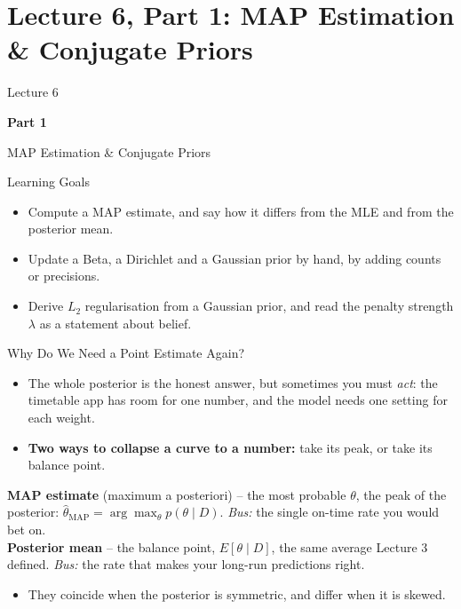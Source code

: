 \section{Lecture 6, Part 1: MAP Estimation \& Conjugate Priors}

\begin{frame}
\vfill
\centering
{\color{RLBlue}\large Lecture 6}

\vspace{0.3em}
{\color{RLBlue}\Large\bfseries Part 1}

\vspace{0.6em}
{\Large MAP Estimation \& Conjugate Priors}
\vfill
\end{frame}

\begin{frame}{Learning Goals}
\begin{itemize}
  \item Compute a MAP estimate, and say how it differs from the MLE and from the posterior mean.
  \pause
  \item Update a Beta, a Dirichlet and a Gaussian prior by hand, by adding counts or precisions.
  \pause
  \item Derive $L_2$ regularisation from a Gaussian prior, and read the penalty strength $\lambda$ as a statement about belief.
\end{itemize}
\end{frame}

\begin{frame}{Why Do We Need a Point Estimate Again?}
\begin{itemize}
  \item The whole posterior is the honest answer, but sometimes you must \emph{act}: the timetable app has room for one number, and the model needs one setting for each weight.
  \pause
  \item \textbf{Two ways to collapse a curve to a number:} take its peak, or take its balance point.
\end{itemize}
\pause
\begin{rldefinition}
\textbf{MAP estimate} (maximum a posteriori) -- the most probable $\theta$, the peak of the posterior: $\hat{\theta}_{\text{MAP}} = \arg\max_\theta p(\theta \mid D)$. \emph{Bus:} the single on-time rate you would bet on.\\
\textbf{Posterior mean} -- the balance point, $E[\theta \mid D]$, the same average Lecture 3 defined. \emph{Bus:} the rate that makes your long-run predictions right.
\end{rldefinition}
\pause
\begin{itemize}
  \item They coincide when the posterior is symmetric, and differ when it is skewed.
\end{itemize}
\end{frame}

